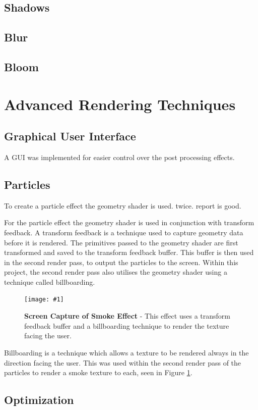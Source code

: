 \documentclass[conference]{acmsiggraph}
\newcommand{\figuremacroW}[4]{
\begin{figure}[h] %
	\centering
	\texttt{[image: \#1]}
	\caption[#2]{\textbf{#2} - #3}
	\label{fig:#1}
\end{figure}
}
\begin{document}
\subsection{Shadows}
	
\subsection{Blur}
	
\subsection{Bloom}
\section{Advanced Rendering Techniques}
	
\subsection{Graphical User Interface}
A GUI was implemented for easier control over the post processing effects. 
	
\subsection{Particles}
	
To create a particle effect the geometry shader is used. twice. report is good.

For the particle effect the geometry shader is used in conjunction with transform feedback. A transform feedback is a technique used to capture geometry data before it is rendered. The primitives passed to the geometry shader are first transformed and saved to the transform feedback buffer. This buffer is then used in the second render pass, to output the particles to the screen. Within this project, the second render pass also utilises the geometry shader using a technique called billboarding.

\figuremacroW
{billboards}
{Screen Capture of Smoke Effect}
{This effect uses a transform feedback buffer and a billboarding technique to render the texture facing the user.}
{1.0}

Billboarding is a technique which allows a texture to be rendered always in the direction facing the user. This was used within the second render pass of the particles to render a smoke texture to each, seen in Figure \ref{fig:billboards}.
 
	
\subsection{Optimization}
	
\end{document}
